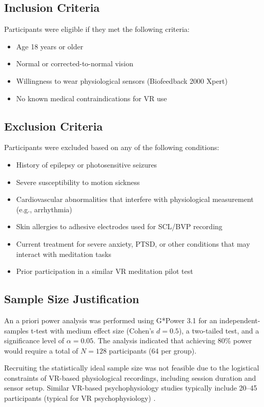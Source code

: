 \subsection{Inclusion Criteria}
Participants were eligible if they met the following criteria:
\begin{itemize}
    \item Age 18 years or older
    \item Normal or corrected-to-normal vision
    \item Willingness to wear physiological sensors (Biofeedback 2000 Xpert)
    \item No known medical contraindications for VR use
\end{itemize}

\subsection{Exclusion Criteria}
Participants were excluded based on any of the following conditions:
\begin{itemize}
    \item History of epilepsy or photosensitive seizures
    \item Severe susceptibility to motion sickness
    \item Cardiovascular abnormalities that interfere with physiological measurement (e.g., arrhythmia)
    \item Skin allergies to adhesive electrodes used for SCL/BVP recording
    \item Current treatment for severe anxiety, PTSD, or other conditions that may interact with meditation tasks
    \item Prior participation in a similar VR meditation pilot test
\end{itemize}

\subsection{Sample Size Justification}
An a priori power analysis was performed using G*Power 3.1 \cite{Faul2007GPower3} for an independent-samples t-test with medium effect size (Cohen's $d = 0.5$), a two-tailed test, and a significance level of $\alpha = 0.05$. The analysis indicated that achieving 80\% power would require a total of $N = 128$ participants (64 per group). 

Recruiting the statistically ideal sample size was not feasible due to the logistical constraints of VR-based physiological recordings, including session duration and sensor setup. Similar VR-based psychophysiology studies typically include 20–45 participants (typical for VR psychophysiology) \cite{weibel2020biofeedback,brief2025vrbiofeedback, Zimmer2019VR_TSST,rodrigues2021IMVEST}. 

